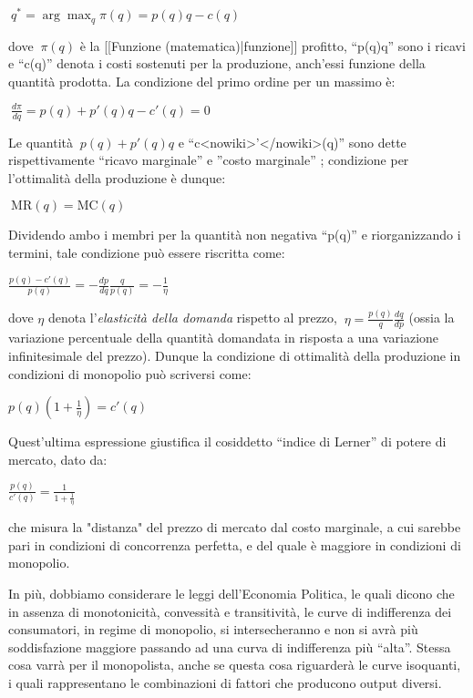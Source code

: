 \(\ q^{*}=\arg\max_{q}\pi(q)=p(q)q-c(q)\)

dove \(\ \pi(q)\) è la [[Funzione (matematica)|funzione]] profitto, 
``p(q)q'' sono i ricavi e ``c(q)'' denota i costi sostenuti per la produzione, 
anch'essi funzione della quantità prodotta. La condizione del primo ordine per 
un massimo è:

\(\ \frac{d\pi}{dq} = p(q)+p'(q)q-c'(q)=0\)

Le quantità \(\ p(q)+p'(q)q\) e ``c<nowiki>'</nowiki>(q)'' sono dette 
rispettivamente ``ricavo marginale'' 
e ''costo marginale'' 
; condizione per l'ottimalità della produzione è dunque:

\(\ \textrm{MR}(q)=\textrm{MC}(q)\)

Dividendo ambo i membri per la quantità non negativa ``p(q)'' e riorganizzando 
i termini, tale condizione può essere riscritta come:

\(\frac{p(q)-c'(q)}{p(q)}=-\frac{dp}{dq}\frac{q}{p(q)}=-\frac{1}{\eta}\)

dove \(\eta\) denota l'\emph{elasticità della domanda} rispetto al 
prezzo, \(\ \eta=\frac{p(q)}{q}\frac{dq}{dp}\) (ossia la variazione 
percentuale della quantità domandata in risposta a una variazione 
infinitesimale del prezzo). Dunque la condizione di ottimalità della produzione 
in condizioni di monopolio può scriversi come:

\(p(q)\left(1+\frac{1}{\eta}\right)=c'(q)\)

Quest'ultima espressione giustifica il cosiddetto ``indice di Lerner'' di 
potere di mercato, dato da:

\(\frac{p(q)}{c'(q)}=\frac{1}{1+\frac{1}{\eta}}\)

che misura la "distanza" del prezzo di mercato dal costo marginale, a cui 
sarebbe pari in condizioni di concorrenza perfetta, e del quale è maggiore 
in condizioni di monopolio.

In più, dobbiamo considerare le leggi dell'Economia Politica, le quali dicono 
che in assenza di monotonicità, convessità e transitività, le curve di 
indifferenza dei consumatori, in regime di monopolio, si intersecheranno e non 
si avrà più soddisfazione maggiore passando ad una curva di indifferenza più 
``alta''.
Stessa cosa varrà per il monopolista, anche se questa cosa riguarderà le curve 
isoquanti, i quali rappresentano le combinazioni di fattori che producono 
output diversi.

